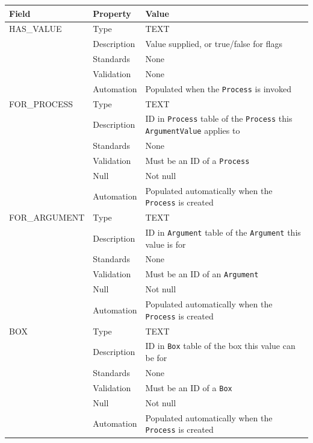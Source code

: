 \documentclass[
]{article}
\newcounter{none} %
\begin{document}
{\def\LTcaptype{none} %
\begin{longtable}[]{@{}
  >{\raggedright\arraybackslash}p{}
  >{\raggedright\arraybackslash}p{}
  >{\raggedright\arraybackslash}p{}@{}}
\toprule\noalign{}
\begin{minipage}[b]{\linewidth}\raggedright
Field
\end{minipage} & \begin{minipage}[b]{\linewidth}\raggedright
Property
\end{minipage} & \begin{minipage}[b]{\linewidth}\raggedright
Value
\end{minipage} \\
\midrule\noalign{}
\endhead
\bottomrule\noalign{}
\endlastfoot
HAS\_VALUE & Type & TEXT \\
& Description & Value supplied, or true/false for flags \\
& Standards & None \\
& Validation & None \\
& Automation & Populated when the \texttt{Process} is invoked \\
FOR\_PROCESS & Type & TEXT \\
& Description & ID in \texttt{Process} table of the \texttt{Process}
this \texttt{ArgumentValue} applies to \\
& Standards & None \\
& Validation & Must be an ID of a \texttt{Process} \\
& Null & Not null \\
& Automation & Populated automatically when the \texttt{Process} is
created \\
FOR\_ARGUMENT & Type & TEXT \\
& Description & ID in \texttt{Argument} table of the \texttt{Argument}
this value is for \\
& Standards & None \\
& Validation & Must be an ID of an \texttt{Argument} \\
& Null & Not null \\
& Automation & Populated automatically when the \texttt{Process} is
created \\
BOX & Type & TEXT \\
& Description & ID in \texttt{Box} table of the box this value can be
for \\
& Standards & None \\
& Validation & Must be an ID of a \texttt{Box} \\
& Null & Not null \\
& Automation & Populated automatically when the \texttt{Process} is
created \\
\end{longtable}
}
\end{document}
